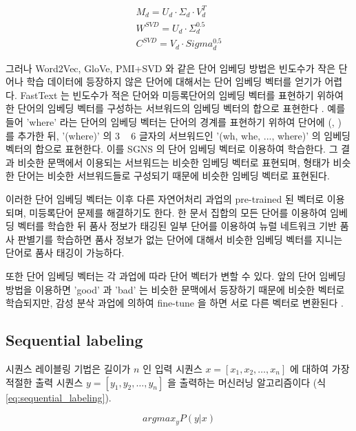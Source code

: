 \documentclass[11pt]{article}
\begin{document}
\begin{equation}
  \label{eq:better_svd}
  \begin{aligned}
  M_d = U_d \cdot \Sigma_d \cdot V_d^T \\
  W^{SVD} = U_d \cdot \Sigma_d^{0.5} \\
  C^{SVD} = V_d \cdot Sigma_d^{0.5}
  \end{aligned}
\end{equation}


그러나 Word2Vec, GloVe, PMI+SVD 와 같은 단어 임베딩 방법은 빈도수가 작은 단어나 학습 데이터에 등장하지 않은 단어에 대해서는 단어 임베딩 벡터를 얻기가 어렵다.
FastText 는 빈도수가 적은 단어와 미등록단어의 임베딩 벡터를 표현하기 위하여 한 단어의 임베딩 벡터를 구성하는 서브워드의 임베딩 벡터의 합으로 표현한다 \citep{bojanowski2017enriching}.
예를 들어 'where' 라는 단어의 임베딩 벡터는 단어의 경계를 표현하기 위하여 단어에 (, ) 를 추가한 뒤, '(where)' 의 3 ~ 6 글자의 서브워드인 '(wh, whe, ..., where)' 의 임베딩 벡터의 합으로 표현한다.
이를 SGNS 의 단어 임베딩 벡터로 이용하여 학습한다.
그 결과 비슷한 문맥에서 이용되는 서브워드는 비슷한 임베딩 벡터로 표현되며, 형태가 비슷한 단어는 비슷한 서브워드들로 구성되기 때문에 비슷한 임베딩 벡터로 표현된다.

이러한 단어 임베딩 벡터는 이후 다른 자연어처리 과업의 pre-trained 된 벡터로 이용되며, 미등록단어 문제를 해결하기도 한다.
한 문서 집합의 모든 단어를 이용하여 임베딩 벡터를 학습한 뒤 품사 정보가 태깅된 일부 단어를 이용하여 뉴럴 네트워크 기반 품사 판별기를 학습하면 품사 정보가 없는 단어에 대해서 비슷한 임베딩 벡터를 지니는 단어로 품사 태깅이 가능하다.

또한 단어 임베딩 벡터는 각 과업에 따라 단어 벡터가 변할 수 있다.
앞의 단어 임베딩 방법을 이용하면 'good' 과 'bad' 는 비슷한 문맥에서 등장하기 때문에 비슷한 벡터로 학습되지만, 감성 분삭 과업에 의하여 fine-tune 을 하면 서로 다른 벡터로 변환된다 \citep{kim2014convolutional, joulin2016bag}.

\subsection{Sequential labeling}

시퀀스 레이블링 기법은 길이가 $n$ 인 입력 시퀀스 $x = [x_1, x_2, \dots, x_n]$ 에 대하여 가장 적절한 출력 시퀀스 $y = [y_1, y_2, \dots, y_n]$ 을 출력하는 머신러닝 알고리즘이다 (식 \ref{eq:sequential_labeling}).

\begin{equation}
  \label{eq:sequential_labeling}
  argmax_y P(y \vert x)
\end{equation}
\end{document}
